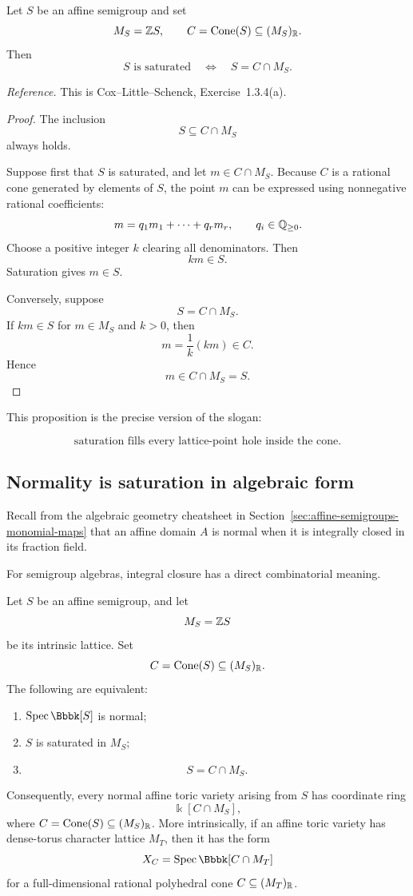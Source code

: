 \begin{proposition}
\label{prop:saturation-cone-lattice-points}
Let \(S\) be an affine semigroup and set
\[
M_S=\mathbb{Z} S,
\qquad
C=\operatorname{Cone}(S)\subseteq(M_S)_{\mathbb{R}}.
\]
Then
\[
S\text{ is saturated}
\quad\Longleftrightarrow\quad
S=C\cap M_S.
\]
\end{proposition}

\noindent
\textit{Reference.}
This is Cox--Little--Schenck, Exercise~1.3.4(a).

\begin{proof}
The inclusion
\[
S\subseteq C\cap M_S
\]
always holds.

Suppose first that \(S\) is saturated, and let \(m\in C\cap M_S\).
Because \(C\) is a rational cone generated by elements of \(S\), the
point \(m\) can be expressed using nonnegative rational coefficients:
\[
m=q_1m_1+\cdots+q_rm_r,
\qquad
q_i\in\mathbb{Q}_{\geq0}.
\]
Choose a positive integer \(k\) clearing all denominators. Then
\[
km\in S.
\]
Saturation gives \(m\in S\).

Conversely, suppose
\[
S=C\cap M_S.
\]
If \(km\in S\) for \(m\in M_S\) and \(k>0\), then
\[
m=\frac1k(km)\in C.
\]
Hence
\[
m\in C\cap M_S=S.
\]
\end{proof}

This proposition is the precise version of the slogan:

\[
\boxed{
\text{saturation fills every lattice-point hole inside the cone.}
}
\]

\subsection{Normality is saturation in algebraic form}

Recall from the algebraic geometry cheatsheet in
Section~\ref{sec:affine-semigroups-monomial-maps} that an affine
domain \(A\) is normal when it is integrally closed in its fraction
field.

For semigroup algebras, integral closure has a direct combinatorial
meaning.

\begin{theorem}
\label{thm:normality-saturation-cone}
Let \(S\) be an affine semigroup, and let
\[
M_S=\mathbb{Z} S
\]
be its intrinsic lattice. Set
\[
C=\operatorname{Cone}(S)\subseteq (M_S)_{\mathbb{R}}.
\]
The following are equivalent:
\begin{enumerate}[label=(\alph*),wide=0pt]
\item \(\Spec\Bbbk[S]\) is normal;
\item \(S\) is saturated in \(M_S\);
\item
\[
S=C\cap M_S.
\]
\end{enumerate}

Consequently, every normal affine toric variety arising from \(S\)
has coordinate ring
\[
\Bbbk[C\cap M_S],
\]
where \(C=\operatorname{Cone}(S)\subseteq(M_S)_{\mathbb{R}}\). More intrinsically, if an
affine toric variety has dense-torus character lattice \(M_T\), then it
has the form
\[
X_C
=
\Spec\Bbbk[C\cap M_T]
\]
for a full-dimensional rational polyhedral cone
\(C\subseteq(M_T)_{\mathbb{R}}\).
\end{theorem}

